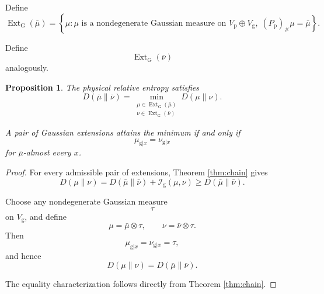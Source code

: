 \documentclass[11pt]{article}
\newtheorem{proposition}[theorem]{Proposition}
\theoremstyle{remark}
\begin{document}
Define
\begin{equation}
\operatorname{Ext}_{\mathrm G}(\bar\mu)
=
\left\{
\mu:
\mu \text{ is a nondegenerate Gaussian measure on }
V_{\mathrm p}\oplus V_{\mathrm g},
\;
(P_{\mathrm p})_\#\mu=\bar\mu
\right\}.
\label{eq:extensions}
\end{equation}

Define
\begin{equation}
\operatorname{Ext}_{\mathrm G}(\bar\nu)
\end{equation}
analogously.

\begin{proposition}
\label{prop:minimal}
The physical relative entropy satisfies
\begin{equation}
D(\bar\mu\|\bar\nu)
=
\min_{\substack{
\mu\in\operatorname{Ext}_{\mathrm G}(\bar\mu)
\\
\nu\in\operatorname{Ext}_{\mathrm G}(\bar\nu)
}}
D(\mu\|\nu).
\label{eq:minimal}
\end{equation}

A pair of Gaussian extensions attains the minimum if and only
if
\begin{equation}
\mu_{\mathrm g|x}
=
\nu_{\mathrm g|x}
\end{equation}
for \(\bar\mu\)-almost every \(x\).
\end{proposition}

\begin{proof}
For every admissible pair of extensions, Theorem
\ref{thm:chain} gives
\begin{equation}
D(\mu\|\nu)
=
D(\bar\mu\|\bar\nu)
+
\mathcal I_{\mathrm g}(\mu,\nu)
\geq
D(\bar\mu\|\bar\nu).
\end{equation}

Choose any nondegenerate Gaussian measure
\begin{equation}
\tau
\end{equation}
on \(V_{\mathrm g}\), and define
\begin{equation}
\mu=\bar\mu\otimes\tau,
\qquad
\nu=\bar\nu\otimes\tau.
\end{equation}
Then
\begin{equation}
\mu_{\mathrm g|x}
=
\nu_{\mathrm g|x}
=
\tau,
\end{equation}
and hence
\begin{equation}
D(\mu\|\nu)
=
D(\bar\mu\|\bar\nu).
\end{equation}

The equality characterization follows directly from Theorem
\ref{thm:chain}.
\end{proof}
\end{document}
